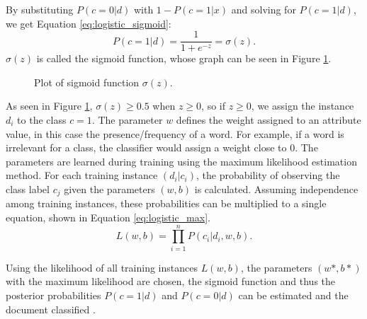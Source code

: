 By substituting $P(c=0|d)$ with $1 - P(c=1|x)$ and solving for $P(c=1|d)$, we get Equation \eqref{eq:logistic_sigmoid}:
        {\begin{equation}
            \label{eq:logistic_sigmoid}
                P(c=1|d) = \frac{1}{1+e^{-z}} = \sigma(z).
        \end{equation}}
$\sigma(z)$ is called the sigmoid function, whose graph can be seen in Figure \ref{fig:sigmoid}.
        \begin{figure}
        \centering

    \caption{Plot of sigmoid function $\sigma(z)$.}
      \label{fig:sigmoid}
\end{figure}
As seen in Figure \ref{fig:sigmoid}, $\sigma(z) \geq 0.5$ when $z \geq 0$, so if $z \geq 0$, we assign the instance $d_i$ to the class $c = 1$. The parameter $w$ defines the weight assigned to an attribute value, in this case the presence/frequency of a word. For example, if a word is irrelevant for a class, the classifier would assign a weight close to 0. The parameters are learned during training using the maximum likelihood estimation method. For each training instance $(d_i|c_i)$, the probability of observing the class label $c_j$ given the parameters $(w,b)$ is calculated. Assuming independence among training instances, these probabilities can be multiplied to a single equation, shown in Equation \eqref{eq:logistic_max}.
        \begin{equation}
            \label{eq:logistic_max}
                L(w,b) = \prod_{i=1}^{n}P(c_i|d_i,w,b).
        \end{equation}
        
Using the likelihood of all training instances $L(w,b)$, the parameters $(w*,b*)$ with the maximum likelihood are chosen, the sigmoid function and thus the posterior probabilities $P(c=1|d)$ and $P(c=0|d)$ can be estimated and the document classified \cite{DBLP:books/aw/TanSKK2019}.


